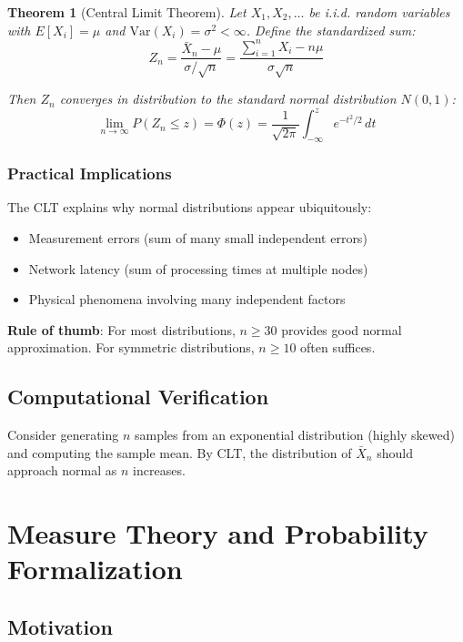 \documentclass[12pt,a4paper]{article}
\newtheorem{theorem}{Theorem}
\begin{document}
\begin{theorem}[Central Limit Theorem]
Let $X_1, X_2, \ldots$ be i.i.d. random variables with $E[X_i] = \mu$ and $\text{Var}(X_i) = \sigma^2 < \infty$. Define the standardized sum:
\begin{equation}
Z_n = \frac{\bar{X}_n - \mu}{\sigma/\sqrt{n}} = \frac{\sum_{i=1}^n X_i - n\mu}{\sigma\sqrt{n}}
\end{equation}

Then $Z_n$ converges in distribution to the standard normal distribution $N(0,1)$:
\begin{equation}
\lim_{n\to\infty} P(Z_n \leq z) = \Phi(z) = \frac{1}{\sqrt{2\pi}}\int_{-\infty}^z e^{-t^2/2}\,dt
\end{equation}
\end{theorem}

\subsubsection{Practical Implications}

The CLT explains why normal distributions appear ubiquitously:
\begin{itemize}
\item Measurement errors (sum of many small independent errors)
\item Network latency (sum of processing times at multiple nodes)
\item Physical phenomena involving many independent factors
\end{itemize}

\textbf{Rule of thumb}: For most distributions, $n \geq 30$ provides good normal approximation. For symmetric distributions, $n \geq 10$ often suffices.

\subsection{Computational Verification}

Consider generating $n$ samples from an exponential distribution (highly skewed) and computing the sample mean. By CLT, the distribution of $\bar{X}_n$ should approach normal as $n$ increases.

\section{Measure Theory and Probability Formalization}

\subsection{Motivation}
\end{document}
